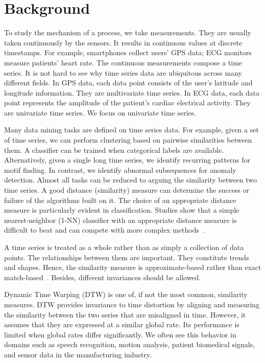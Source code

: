 \section{Background} \label{sec:introduction} %

To study the mechanism of a process, we take measurements.
They are usually taken continuously by the sensors. 
It results in continuous values at discrete timestamps. 
For example, smartphones collect users' GPS data;
ECG monitors measure patients' heart rate.
The continuous measurements compose a time series.
It is not hard to see why time series data are ubiquitous across many different fields.
%
In GPS data, each data point consists of the user's latitude and longitude information.
They are multivariate time series.
In ECG data, each data point represents the amplitude of the patient's cardiac electrical activity.
They are univariate time series.
%
We focus on univariate time series.

Many data mining tasks are defined on time series data.
For example, given a set of time series, we can perform clustering based on pairwise similarities between them.
A classifier can be trained when categorical labels are available.
Alternatively, given a single long time series, we identify recurring patterns for motif finding.
In contrast, we identify abnormal subsequences for anomaly detection.
%
Almost all tasks can be reduced to arguing the similarity between two time series.
A good distance (similarity) measure can determine the success or failure of the algorithms built on it. The choice of an appropriate distance measure is particularly evident in classification.
Studies show that a simple nearest-neighbor (1-NN) classifier with an appropriate distance measure is difficult to beat and can compete with more complex methods~\cite{bagnall2017great}.

A time series is treated as a whole rather than as simply a collection of data points. 
The relationships between them are important. 
They constitute trends and shapes. 
Hence, the similarity measure is approximate-based rather than exact match-based~\cite{fu2011review}. 
Besides, different invariances should be allowed. 

Dynamic Time Warping (DTW) is one of, if not the most common, similarity measures.
DTW provides invariance to time distortion by aligning and measuring the similarity between the two series that are misaligned in time.
However, it assumes that they are expressed at a similar global rate.
Its performance is limited when global rates differ significantly. 
We often see this behavior in domains such as speech recognition, motion analysis, patient biomedical signals, and sensor data in the manufacturing industry.

